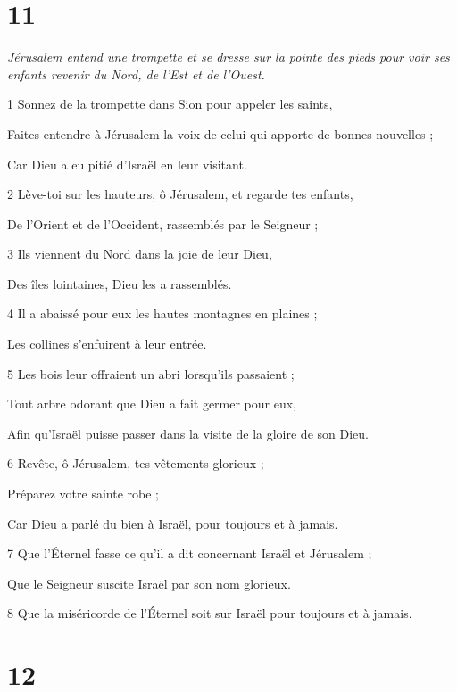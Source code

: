 \chapter{11}

\par \textit{Jérusalem entend une trompette et se dresse sur la pointe des pieds pour voir ses enfants revenir du Nord, de l'Est et de l'Ouest.}

\par 1 Sonnez de la trompette dans Sion pour appeler les saints,
\par     Faites entendre à Jérusalem la voix de celui qui apporte de bonnes nouvelles ;
\par     Car Dieu a eu pitié d’Israël en leur visitant.
\par 2 Lève-toi sur les hauteurs, ô Jérusalem, et regarde tes enfants,
\par     De l'Orient et de l'Occident, rassemblés par le Seigneur ;
\par 3 Ils viennent du Nord dans la joie de leur Dieu,
\par     Des îles lointaines, Dieu les a rassemblés.
\par 4 Il a abaissé pour eux les hautes montagnes en plaines ;
\par     Les collines s'enfuirent à leur entrée.
\par 5 Les bois leur offraient un abri lorsqu'ils passaient ;
\par     Tout arbre odorant que Dieu a fait germer pour eux,
\par     Afin qu'Israël puisse passer dans la visite de la gloire de son Dieu.
\par 6 Revête, ô Jérusalem, tes vêtements glorieux ;
\par     Préparez votre sainte robe ;
\par     Car Dieu a parlé du bien à Israël, pour toujours et à jamais.
\par 7 Que l'Éternel fasse ce qu'il a dit concernant Israël et Jérusalem ;
\par     Que le Seigneur suscite Israël par son nom glorieux.
\par   
\par 8 Que la miséricorde de l'Éternel soit sur Israël pour toujours et à jamais.



\chapter{12}

